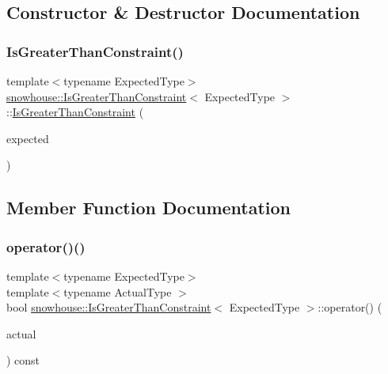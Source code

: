 \subsection{Constructor \& Destructor Documentation}
\mbox{\label{structsnowhouse_1_1IsGreaterThanConstraint_a2d49781d1f61ffb68e8d62c6680943ae}} 
\subsubsection{\texorpdfstring{IsGreaterThanConstraint()}{IsGreaterThanConstraint()}}
{\footnotesize\ttfamily template$<$typename Expected\+Type$>$ \\
\mbox{\hyperlink{structsnowhouse_1_1IsGreaterThanConstraint}{snowhouse\+::\+Is\+Greater\+Than\+Constraint}}$<$ Expected\+Type $>$\+::\mbox{\hyperlink{structsnowhouse_1_1IsGreaterThanConstraint}{Is\+Greater\+Than\+Constraint}} (\begin{DoxyParamCaption}\item[{const Expected\+Type \&}]{expected }\end{DoxyParamCaption})\hspace{0.3cm}{\ttfamily [inline]}}



\subsection{Member Function Documentation}
\mbox{\label{structsnowhouse_1_1IsGreaterThanConstraint_a4c000324f73e0f665305e3ec41e5da5c}} 
\subsubsection{\texorpdfstring{operator()()}{operator()()}}
{\footnotesize\ttfamily template$<$typename Expected\+Type$>$ \\
template$<$typename Actual\+Type $>$ \\
bool \mbox{\hyperlink{structsnowhouse_1_1IsGreaterThanConstraint}{snowhouse\+::\+Is\+Greater\+Than\+Constraint}}$<$ Expected\+Type $>$\+::operator() (\begin{DoxyParamCaption}\item[{const Actual\+Type \&}]{actual }\end{DoxyParamCaption}) const\hspace{0.3cm}{\ttfamily [inline]}}



